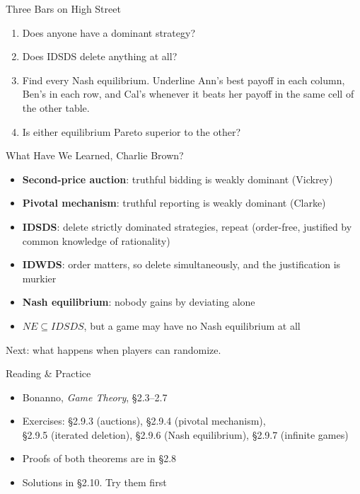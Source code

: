 \begin{frame}{Three Bars on High Street}
\begin{enumerate}
    \item Does anyone have a dominant strategy? \vspace{0.25in}
    \item Does IDSDS delete anything at all? \vspace{0.25in}
    \item Find every Nash equilibrium. Underline Ann's best payoff in each column,
      Ben's in each row, and Cal's whenever it beats her payoff in the same cell
      of the other table. \vspace{0.35in}
    \item Is either equilibrium Pareto superior to the other? \vspace{0.25in}
\end{enumerate}
\end{frame}

\begin{frame}{What Have We Learned, Charlie Brown?}
\begin{itemize}
    \item \textbf{Second-price auction}: truthful bidding is weakly dominant (Vickrey)
    \item \textbf{Pivotal mechanism}: truthful reporting is weakly dominant (Clarke)
    \item \textbf{IDSDS}: delete strictly dominated strategies, repeat (order-free,
      justified by common knowledge of rationality)
    \item \textbf{IDWDS}: order matters, so delete simultaneously, and the
      justification is murkier
    \item \textbf{Nash equilibrium}: nobody gains by deviating alone
    \item $NE\subseteq IDSDS$, but a game may have no Nash equilibrium at all
\end{itemize}
\vfill
Next: what happens when players can randomize.
\vspace{-0.4in}
\end{frame}

\begin{frame}{Reading \& Practice}
\begin{itemize}
    \item Bonanno, \textit{Game Theory}, \S2.3--2.7
    \item Exercises: \S2.9.3 (auctions), \S2.9.4 (pivotal mechanism),\\
      \S2.9.5 (iterated deletion), \S2.9.6 (Nash equilibrium), \S2.9.7 (infinite games)
    \item Proofs of both theorems are in \S2.8
    \item Solutions in \S2.10. Try them first
\end{itemize}
\vfill
\end{frame}


